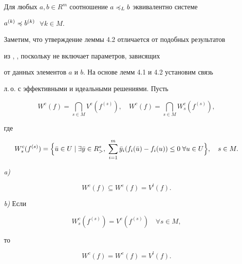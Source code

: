 \begin{lems}


Для любых $a,b\in R^m$ соотношение $a\preccurlyeq_L b$ эквивалентно системе


$a^{(k)}\preccurlyeq b^{(k)}$ $\;\forall k\in M$.


\end{lems}





Заметим, что утверждение леммы 4.2 отличается от подобных результатов


из \cite{Pod1}, \cite{Mar}, поскольку не включает параметров, зависящих


от данных элементов $a$ и $b$. На основе лемм 4.1 и 4.2 установим связь


л.\,о. с эффективными и идеальными решениями. Пусть


$$


W^e(f)=\bigcap_{s\in M}V^e(f^{(s)}),\quad


W^c(f)=\bigcap_{s\in M}W^c_s(f^{(s)}),


$$


где


$$


W^c_s(f^{(s)})=\Bigl\{\Bar u\in U\mid\exists\Bar y\in R^s_{>},\;


\sum^m_{i=1}\Bar y_i(f_i(\Bar u)-f_i(u))\le 0\;


\forall u\in U\Bigr\},\quad s\in M.


$$





\begin{thms} {\em a)}


\begin{equation}


W^c(f)\subseteq W^e(f)=V^l(f).


\end{equation}





{\em b)} Если


\begin{equation}


W^c_s(f^{(s)})=V^e(f^{(s)})\quad \forall s\in M,


\end{equation}


то


\begin{equation}


W^c(f)=W^e(f)=V^l(f).


\end{equation}


\end{thms}





